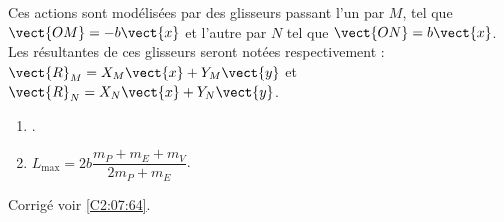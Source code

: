 Ces actions sont modélisées par des glisseurs passant l'un par $M$, tel que $\vect{OM}=-b\vect{x}$ et l'autre par $N$ tel que $\vect{ON}=b\vect{x}$. 
Les résultantes de ces glisseurs seront notées respectivement : $\vect{R}_M=X_M\vect{x}+Y_M\vect{y}$ 
et $\vect{R}_N=X_N\vect{x}+Y_N\vect{y}$.

\fi

\ifprof
\else
\fi

\ifprof
\else
\fi


\ifprof
\footnotesize
\begin{enumerate}
\item .
\item $L_{\text{max}}=2b\dfrac{m_P+m_E+m_V}{2m_P+m_E}$.
\end{enumerate}
\normalsize
\else
\begin{flushright}
\footnotesize{Corrigé  voir \ref{C2:07:64}.}
\end{flushright}%
\fi